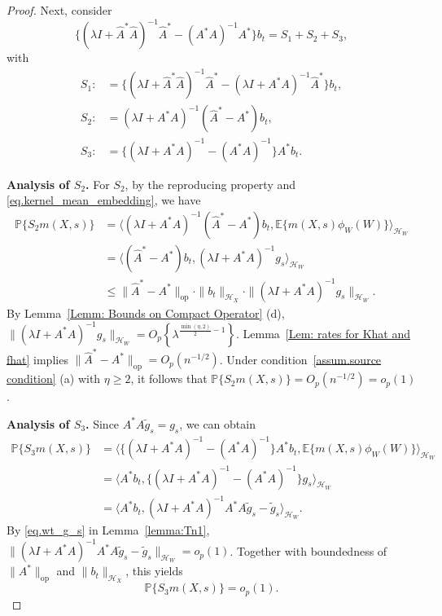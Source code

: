 \documentclass[
  12pt]{article}
\def\wt{\widetilde}
\def\cH{\mathcal{H}}
\begin{document}
\begin{proof}
Next, consider
$$
\{(\lambda I+\widehat{A}^*\widehat{A})^{-1}\widehat{A}^*-(A^*A)^{-1}A^*\}b_t=S_1+S_2+S_3,
$$
with
\begin{align*}
	S_1:&=\{(\lambda I+\widehat{A}^*\widehat{A})^{-1}\widehat{A}^*-(\lambda I+A^*A)^{-1}\widehat{A}^*\}b_t,\\
	S_2:&=(\lambda I+A^*A)^{-1}(\widehat{A}^*-A^*)b_t,\\
	S_3:&=\big\{ (\lambda I+A^*A)^{-1}-(A^*A)^{-1} \big\} A^*b_t.
\end{align*}

\textbf{Analysis of $S_2$.} For $S_2$, by the reproducing property and \eqref{eq.kernel_mean_embedding}, we have
\begin{align*}
	\mathbb{P} \{S_2m(X,s) \}&=\langle (\lambda I+A^*A)^{-1}(\widehat{A}^*-A^*)b_t,\mathbb{E} \{ m(X,s) \phi_W(W) \} \rangle_{\mathcal{H}_W}\\
	&=\langle (\widehat{A}^*-A^*)b_t,(\lambda I+A^*A)^{-1}g_s \rangle_{\mathcal{H}_W}\\
	&\le \| \widehat{A}^*-A^* \|_{\mathrm{op}}\cdot\| b_t \|_{\mathcal{H}_X}\cdot \| (\lambda I+A^*A)^{-1}g_s\|_{\mathcal{H}_W}.
\end{align*}
By Lemma~\ref{Lemm: Bounds on Compact Operator} (d), $\| (\lambda I+A^*A)^{-1}g_s \|_{\mathcal{H}_W}=O_p \left\{\lambda^{\frac{\min(\eta,2)}{2}-1} \right\}$. Lemma~\ref{Lem: rates for Khat and fhat} implies $\| \widehat{A}^*-A^*\|_{\mathrm{op}}=O_p(n^{-1/2})$. Under condition~\ref{assum.source condition} (a) with $\eta \geq 2$, it follows that $\mathbb{P} \{S_2m(X,s) \}=O_p(n^{-1/2})=o_p(1)$.




\textbf{Analysis of $S_3$.} Since $A^*A\wt{g}_s=g_s$, we can obtain
\begin{align*}
	\mathbb{P} \{S_3m(X,s)\}&=\langle \{ (\lambda I+A^*A)^{-1}-(A^*A)^{-1} \} A^*b_{t},\mathbb{E} \{m(X,s)\phi_W(W)\}\rangle_{\mathcal{H}_W}\\
	&=\langle A^*b_{t},\{ (\lambda I+A^*A)^{-1}-(A^*A)^{-1} \} g_s\rangle_{\mathcal{H}_W}\\
	&=\langle A^*b_{t},(\lambda I+A^*A)^{-1}A^*A\wt{g}_s-\wt{g}_s\rangle_{\mathcal{H}_W}.
\end{align*}
By \eqref{eq.wt_g_s} in Lemma~\ref{lemma:Tn1}, $\|(\lambda I+A^*A)^{-1}A^*A\wt{g}_s-\wt{g}_s\|_{\cH_W}=o_p(1)$. Together with boundedness of $\|A^*\|_{\mathrm{op}}$ and $\|b_t\|_{\cH_X}$, this yields
$$
\mathbb{P} \{S_3m(X,s)\}=o_p(1).
$$



\end{proof}
\end{document}
